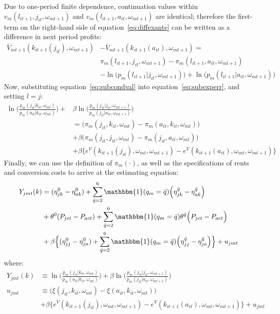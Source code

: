 \documentclass[11pt]{article}
\begin{document}
Due to one-period finite dependence, continuation values within $v_m(l_{it+1},j_{it},\omega_{mt+1})$ and $v_m(l_{it+1},a_{it},\omega_{mt+1})$ are identical; therefore the first-term on the right-hand side of equation~\ref{eq:diffexante} can be written as a difference in next period profits:
\begin{align}  \label{eq:subcondval}
\bar{V}_{mt+1}(k_{it+1}(j_{it}),\omega_{mt+1})& -  \bar{V}_{mt+1}(k_{it+1}(a_{it}),\omega_{mt+1}) = \\ \nonumber
& \pi_m(l_{it+1},j_{it},\omega_{mt+1}) - \pi_m(l_{it+1},a_{it},\omega_{mt+1})\\ 
& - \ln\big(p_m(l_{it+1}|j_{it},\omega_{mt+1})\big) + \ln\big(p_m(l_{it+1}|a_{it},\omega_{mt+1})\big) \nonumber
\end{align}
Now, substituting equation~\ref{eq:subcondval} into equation~\ref{eq:subexperr}, and setting $l = j$:
\begin{align} 
\ln\bigg(\frac{p_m(j_{it}|k_{it},\omega_{mt})}{p_m(a_{it}|k_{it},\omega_{mt})}\bigg) + & \beta\ln\bigg(\frac{p_m(j_{it}|j_{it},\omega_{mt+1})}{p_m(j_{it}|a_{it},\omega_{mt+1})}\bigg) \\
 &=\big(\pi_m(j_{it},k_{it},\omega_{mt}) - \pi_m(a_{it},k_{it},\omega_{mt})\big)  \nonumber \\
	& + \beta \big(\pi_m(j_{it},j_{it},\omega_{mt}) - \pi_m(j_{it},a_{it},\omega_{mt})\big) \nonumber \\ 
	& + \beta \Big\{e^V(k_{it+1}(j_{it}),\omega_{mt},\omega_{mt+1}) -  e^V(k_{it+1}(a_{it}),\omega_{mt},\omega_{mt+1})\Big\} \nonumber
\end{align}
Finally, we can use the definition of $\pi_m(\cdot)$, as well as the specifications of rents and conversion costs to arrive at the estimating equation:
\begin{align}
Y_{jmt}(k) &= (\eta^0_{jk} - \eta^0_{ak}) + \sum_{\bar{q} = 2}^6 \mathbbm{1}(q_{m} = \bar{q}) \Big(\eta^{\bar{q}}_{jk} - \eta^{\bar{q}}_{ak} \Big) \\
	& + \theta^0(P_{jct} - P_{act}) +   \sum_{\bar{q} = 2}^6 \mathbbm{1}(q_{m} = \bar{q}) \theta^{\bar{q}} \Big(P_{jct} - P_{act}\Big) \nonumber \\ \nonumber
	& + \beta \Big\{(\eta^0_{jj} - \eta^0_{ja}) + \sum_{\bar{q} = 2}^6 \mathbbm{1}(q_{m} = \bar{q}) \Big(\eta^{\bar{q}}_{jj} - \eta^{\bar{q}}_{ja} \Big) \Big\} + u_{jmt} \nonumber
\end{align}
where:
\begin{align}
Y_{jmt}(k) &\equiv \ln\bigg(\frac{p_m(j_{it}|k_{it},\omega_{mt})}{p_m(a_{it}|k_{it},\omega_{mt})}\bigg) + \beta\ln\bigg(\frac{p_m(j_{it}|j_{it},\omega_{mt+1})}{p_m(j_{it}|a_{it},\omega_{mt+1})}\bigg) \\
u_{jmt} &\equiv \Big(\xi(j_{it},k_{it},\omega_{mt}) - \xi(a_{it},k_{it},\omega_{mt})\Big) \\
& + \beta \Big\{e^V(k_{it+1}(j_{it}),\omega_{mt},\omega_{mt+1}) -  e^V(k_{it+1}(a_{it}),\omega_{mt},\omega_{mt+1})\Big\} + u_{jmt} \nonumber 
\end{align}
\end{document}
